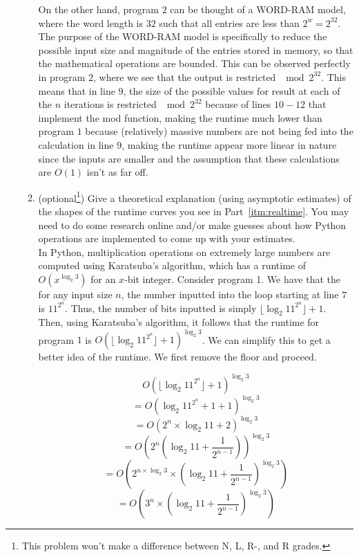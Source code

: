 \documentclass[11pt]{article}
\begin{document}
\begin{enumerate}
\begin{enumerate}
    On the other hand, program $2$ can be thought of a WORD-RAM model, where the word length is $32$ such that all entries are less than $2^w = 2^{32}$. The purpose of the WORD-RAM model is specifically to reduce the possible input size and magnitude of the entries stored in memory, so that the mathematical operations are bounded. This can be observed perfectly in program $2$, where we see that the output is restricted $\mod 2^{32}$. This means that in line $9$, the size of the possible values for result at each of the $n$ iterations is restricted $\mod 2^{32}$ because of lines $10-12$ that implement the mod function, making the runtime much lower than program $1$ because (relatively) massive numbers are not being fed into the calculation in line $9$, making the runtime appear more linear in nature since the inputs are smaller and the assumption that these calculations are $O(1)$ isn't as far off. \\
    
    \item (optional\footnote{This problem won't make a difference between N, L, R-, and R grades.}) Give a theoretical explanation (using asymptotic estimates) of the shapes of the runtime curves you see in Part~\ref{itm:realtime}. You may need to do some research online and/or make guesses about how Python operations are implemented to come up with your estimates. \\
    
    In Python, multiplication operations on extremely large numbers are computed using Karatsuba's algorithm, which has a runtime of $O(x^{\log_2 3})$  for an $x$-bit integer. Consider program 1. We have that the for any input size $n$, the number inputted into the loop starting at line $7$ is $11^{2^n}$. Thus, the number of bits inputted is simply $\lfloor \log_2 11^{2^n} \rfloor + 1$. Then, using Karatsuba's algorithm, it follows that the runtime for program $1$ is $O\left ( \lfloor \log_2 11^{2^n} \rfloor + 1 \right)^{\log_2 3}$. We can simplify this to get a better idea of the runtime. We first remove the floor and proceed.
    
    $$
    O\left ( \lfloor \log_2 11^{2^n} \rfloor + 1 \right)^{\log_2 3}
    $$
    $$
     = O\left ( \log_2 11^{2^n} + 1 + 1 \right)^{\log_2 3}
    $$
    $$
     = O\left ( 2^n \times \log_2 11 + 2 \right)^{\log_2 3}
    $$
    $$
     = O\left ( 2^n \left(\log_2 11 + \frac{1}{2^{n-1}}\right) \right)^{\log_2 3}
    $$
    $$
     = O\left ( 2^{n \times \log_2 3} \times \left(\log_2 11 + \frac{1}{2^{n-1}}\right)^{\log_2 3} \right)
    $$
    $$
     = O\left ( 3^n \times \left(\log_2 11 + \frac{1}{2^{n-1}}\right)^{\log_2 3} \right)
    $$
    

\end{enumerate}
\end{enumerate}
\end{document}
